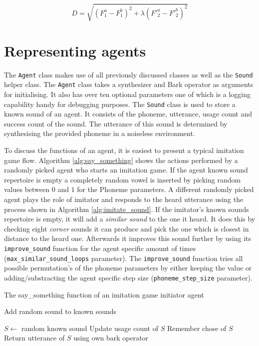 \begin{equation}
D = \sqrt{ ( F^a_1 - F^b_1 ) ^2 + \lambda ( F'^a_2 - F'^b_2 )^2 }
\label{eq:reimplementing_distance}
\end{equation}

\section{Representing agents}
\label{sec:reimplementing_agents}

The \texttt{Agent} class makes use of all previously discussed classes as well as the \texttt{Sound} helper class.
The \texttt{Agent} class takes a synthesizer and Bark operator as arguments for initialising.
It also has over ten optional parameters one of which is a logging capability handy for debugging purposes.
The \texttt{Sound} class is used to store a known sound of an agent.
It consists of the phoneme, utterance, usage count and success count of the sound.
The utterance of this sound is determined by synthesising the provided phoneme in a noiseless environment.

To discuss the functions of an agent, it is easiest to present a typical imitation game flow.
Algorithm \ref{alg:say_something} shows the actions performed by a randomly picked agent who starts an imitation game.
If the agent known sound repertoire is empty a completely random vowel is inserted by picking random values between $0$ and $1$ for the Phoneme parameters.
A different randomly picked agent plays the role of imitator and responds to the heard utterance using the process shown in Algorithm \ref{alg:imitate_sound}.
If the imitator's known sounds repertoire is empty, it will add a \textit{similar sound} to the one it heard.
It does this by checking eight \textit{corner} sounds it can produce and pick the one which is closest in distance to the heard one.
Afterwards it improves this sound further by using its \texttt{improve\_sound} function for the agent specific amount of times (\texttt{max\_similar\_sound\_loops} parameter).
The \texttt{improve\_sound} function tries all possible permutation's of the phoneme parameters by either keeping the value or adding/substracting the agent specific step size (\texttt{phoneme\_step\_size} parameter).


\begin{algorithm}[hbt!]
\caption{The say\_something function of an imitation game initiator agent}\label{alg:say_something}
\begin{algorithmic}
    \State Add random sound to known sounds
\EndIf

\State $S \gets$ random known sound
\State Update usage count of $S$
\State Remember chose of $S$
\State Return utterance of $S$ using own bark operator


\end{algorithmic}
\end{algorithm}

